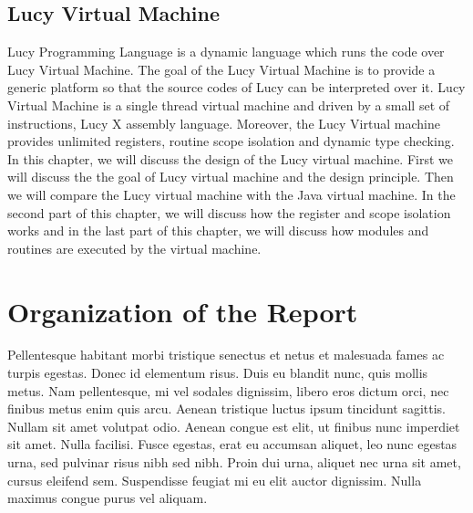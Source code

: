 \subsection{Lucy Virtual Machine}
Lucy Programming Language is a dynamic language which runs the code over Lucy Virtual Machine. The goal of the Lucy Virtual Machine is to provide a generic platform so that the source codes of Lucy can be interpreted over it. Lucy Virtual Machine is a single thread virtual machine and driven by a small set of instructions, Lucy X assembly language. Moreover, the Lucy Virtual machine provides unlimited registers, routine scope isolation and dynamic type checking. In this chapter, we will discuss the design of the Lucy virtual machine. First we will discuss the the goal of Lucy virtual machine and the design principle. Then we will compare the Lucy virtual machine with the Java virtual machine. In the second part of this chapter, we will discuss how the register and scope isolation works and in the last part of this chapter, we will discuss how modules and routines are executed by the virtual machine.

\section{Organization of the Report}
Pellentesque habitant morbi tristique senectus et netus et malesuada fames ac turpis egestas. Donec id elementum risus. Duis eu blandit nunc, quis mollis metus. Nam pellentesque, mi vel sodales dignissim, libero eros dictum orci, nec finibus metus enim quis arcu. Aenean tristique luctus ipsum tincidunt sagittis. Nullam sit amet volutpat odio. Aenean congue est elit, ut finibus nunc imperdiet sit amet. Nulla facilisi. Fusce egestas, erat eu accumsan aliquet, leo nunc egestas urna, sed pulvinar risus nibh sed nibh. Proin dui urna, aliquet nec urna sit amet, cursus eleifend sem. Suspendisse feugiat mi eu elit auctor dignissim. Nulla maximus congue purus vel aliquam.
